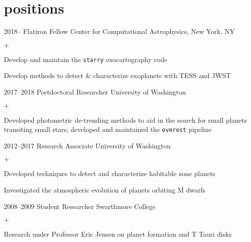 \documentclass[]{luger-cv} %
\begin{document}
\section{positions}

\begin{entrylist}


\entry
{2018--}
{Flatiron Fellow}
{Center for Computational Astrophysics, New York, NY}
{%
\vspace{-1em}
\begin{list}{$+$}{\cvlist}
\item Develop and maintain the \texttt{starry} exocartography code
\item Develop methods to detect \& characterize exoplanets with TESS and JWST
\end{list}
}


\entry
{2017--2018}
{Postdoctoral Researcher}
{University of Washington}
{%
\vspace{-1em}
\begin{list}{$+$}{\cvlist}
\item Developed photometric de-trending methods to aid in the search for small
      planets transiting small stars; developed and maintained the \texttt{everest} pipeline
\end{list}
}


\entry
{2012--2017}
{Research Associate}
{University of Washington}
{%
\vspace{-1em}
\begin{list}{$+$}{\cvlist}
\item Developed techniques to detect and characterize habitable
zone planets
\item Investigated the atmospheric evolution of planets orbiting M dwarfs
\end{list}
}


\ifdefined \onepage \else
\entry
{2008--2009}
{Student Researcher}
{Swarthmore College}
{%
\vspace{-1em}
\begin{list}{$+$}{\cvlist}
\item Research under Professor Eric Jensen on planet formation and T Tauri disks
\end{list}
}
\fi


\end{entrylist}
\end{document}
